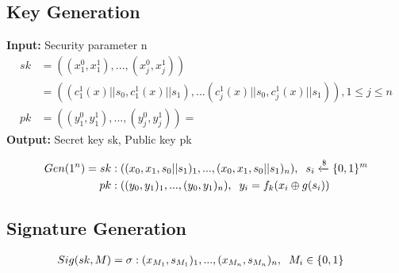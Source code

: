 \documentclass[]{scrartcl}
\makeatletter
\newcommand{\mathcenter}{\@fleqnfalse}
\makeatother
\begin{document}
\subsection*{Key Generation}
\textbf{Input:} Security parameter n
\mathcenter
\begin{equation}
\begin{split}
sk & = ((x_{1}^0, x_{1}^{1}),...,(x_{j}^0, x_{j}^{1})) \\
& = ((c^1_1(x)||s_0,c^1_1(x)||s_1),...(c^1_j(x)||s_0,c^1_j(x)||s_1)), 1 \leq j \leq n\\
pk & = ((y_{1}^0, y_{1}^{1}),...,(y_{j}^0, y_{j}^{1})) = 
\end{split}
\end{equation}
\textbf{Output:} Secret key sk, Public key pk

\mathcenter
\begin{equation}
\begin{split}
Gen(1^n) = sk & : ((x_0, x_1, s_0||s_1)_1,...,(x_0, x_1, s_0||s_1)_n), \hspace{0.2cm} s_i \xleftarrow{\$} \{0,1\}^m \\
pk & : ((y_0, y_1)_1,...,(y_0, y_1)_n), \hspace{0.2cm} y_i = f_k(x_i \oplus g(s_i))
\end{split}
\end{equation}

\subsection*{Signature Generation}
\mathcenter
\begin{equation}
\begin{split}
Sig(sk, M) = \sigma & : (x_{M_1}, s_{M_1})_1,...,(x_{M_n}, s_{M_n})_n, \hspace{0.2cm} M_i \in \{0, 1\}
\end{split}
\end{equation}
\end{document}
